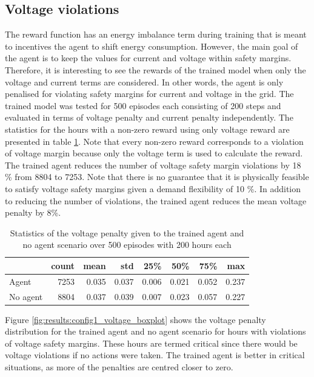 \documentclass[class=book, crop=false, 11pt]{standalone}
\begin{document}
\subsection{Voltage violations}
The reward function has an energy imbalance term during training that is meant to incentives the agent to shift energy consumption. However, the main goal of the agent is to keep the values for current and voltage within safety margins. Therefore, it is interesting to see the rewards of the trained model when only the voltage and current terms are considered. In other words, the agent is only penalised for violating safety margins for current and voltage in the grid. The trained model was tested for 500 episodes each consisting of 200 steps and evaluated
in terms of voltage penalty and current penalty independently. The statistics for the hours with a non-zero reward using only voltage reward are presented in table \ref{table:results:configuration1_reward_500_episodes}. Note that every non-zero reward corresponds to a violation of voltage margin because only the voltage term is used to calculate the reward. The trained agent reduces the number of voltage safety margin violations by 18 \% from 8804 to 7253. Note that there is no guarantee that it is physically feasible to satisfy voltage safety margins given a demand flexibility of 10 \%. In addition to reducing the number of violations, the trained agent reduces the mean voltage penalty by 8\%.
\begin{table}[h]
\center
\caption{Statistics of the voltage penalty given to the trained agent and no agent scenario over 500 episodes with 200 hours each}
\begin{tabular}{l|rrrrrrr}
         & count    & mean  & std   & 25\%  & 50\%  & 75\%  & max   \\
\hline
Agent    & 7253 & 0.035 & 0.037 & 0.006 & 0.021 & 0.052 & 0.237 \\
No agent & 8804 & 0.037 & 0.039 & 0.007 & 0.023 & 0.057 & 0.227 \\
\hline
\end{tabular}
\label{table:results:configuration1_reward_500_episodes}
\end{table}

Figure \ref{fig:results:config1_voltage_boxplot} shows the voltage penalty distribution for the trained agent and no agent scenario for hours with violations of voltage safety margins. These hours are termed critical since there would be voltage violations if no actions were taken. The trained agent is better in critical situations, as more of the penalties are centred closer to zero.
\end{document}
